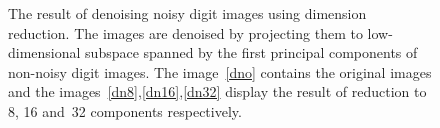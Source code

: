 \documentclass{article}
\begin{document}
\begin{figure}
\caption{The result of denoising noisy digit images using dimension reduction. The images are denoised by projecting them to low-dimensional subspace spanned by the first principal components of non-noisy digit images. The image~\ref{dno} contains the original images and the images~\ref{dn8},\ref{dn16},\ref{dn32} display the result of reduction to 8, 16 and~32 components respectively.}\label{fig:denoise}
\end{figure}
\end{document}
